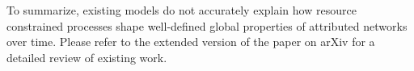 To summarize, existing models do not accurately explain how resource constrained processes
shape well-defined global properties of attributed networks over time.
Please refer to the
extended version of the paper on arXiv for a detailed review of existing work.





